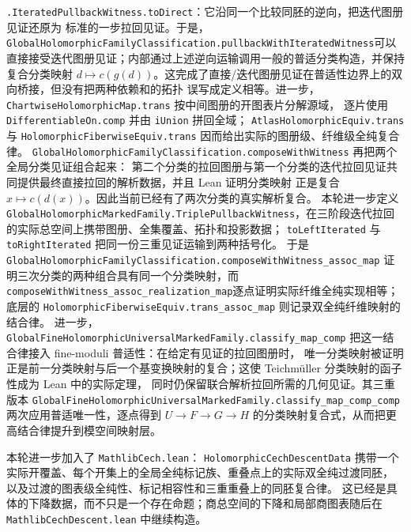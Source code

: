 \documentclass[UTF8,fontset=none,a4paper,11pt]{ctexart}
\begin{document}
\texttt{.IteratedPullbackWitness.toDirect}：它沿同一个比较同胚的逆向，把迭代图册见证还原为
标准的一步拉回见证。于是，\texttt{GlobalHolomorphicFamilyClassification}\linebreak[3]
\texttt{.pullbackWithIterated}\linebreak[4]
\texttt{Witness}\linebreak[4]
可以直接接受迭代图册见证；内部通过上述逆向运输调用一般的普适分类构造，并保持复合分类映射
\(d\mapsto c(g(d))\)。这完成了直接/迭代图册见证在普适性边界上的双向桥接，但没有把两种依赖和的拓扑
误写成定义相等。进一步，\texttt{ChartwiseHolomorphicMap.trans} 按中间图册的开图表片分解源域，
逐片使用 \texttt{DifferentiableOn.comp} 并由 \texttt{iUnion} 拼回全域；
\texttt{AtlasHolomorphicEquiv.trans} 与
\texttt{HolomorphicFiberwiseEquiv.trans} 因而给出实际的图册级、纤维级全纯复合律。
\texttt{GlobalHolomorphicFamilyClassification.composeWithWitness} 再把两个全局分类见证组合起来：
第二个分类的拉回图册与第一个分类的迭代拉回见证共同提供最终直接拉回的解析数据，并且 Lean 证明分类映射
正是复合 \(x\mapsto c(d(x))\)。因此当前已经有了两次分类的真实解析复合。
本轮进一步定义 \texttt{GlobalHolomorphicMarkedFamily.}\linebreak[3]
\texttt{TriplePullbackWitness}，在三阶段迭代拉回的实际总空间上携带图册、全集覆盖、拓扑和投影数据；
\texttt{toLeftIterated} 与 \texttt{toRightIterated} 把同一份三重见证运输到两种括号化。
于是 \texttt{GlobalHolomorphicFamilyClassification.}\linebreak[3]
\texttt{composeWithWitness\_assoc\_map} 证明三次分类的两种组合具有同一个分类映射，而
\texttt{composeWithWitness\_assoc\_realization\_map}\linebreak[3]
逐点证明实际纤维全纯实现相等；底层的 \texttt{HolomorphicFiberwiseEquiv.}\linebreak[3]
\texttt{trans\_assoc\_map} 则记录双全纯纤维映射的结合律。
进一步，\texttt{GlobalFineHolomorphicUniversalMarkedFamily.}\linebreak[3]
\texttt{classify\_map\_comp} 把这一结合律接入 fine-moduli 普适性：在给定有见证的拉回图册时，
唯一分类映射被证明正是前一分类映射与后一个基变换映射的复合；这使 Teichmüller 分类映射的函子性成为 Lean 中的实际定理，
同时仍保留联合解析拉回所需的几何见证。其三重版本
\texttt{GlobalFineHolomorphicUniversalMarkedFamily.}\linebreak[3]
\texttt{classify\_map\_comp\_comp} 两次应用普适唯一性，逐点得到
\(U\to F\to G\to H\) 的分类映射复合式，从而把更高结合律提升到模空间映射层。\par
本轮进一步加入了 \texttt{MathlibCech.lean}：
\texttt{HolomorphicCechDescentData} 携带一个实际开覆盖、每个开集上的全局全纯标记族、重叠点上的实际双全纯过渡同胚，
以及过渡的图表级全纯性、标记相容性和三重重叠上的同胚复合律。
这已经是具体的下降数据，而不只是一个存在命题；商总空间的下降和局部商图表随后在
\texttt{MathlibCechDescent.lean} 中继续构造。
\end{document}
